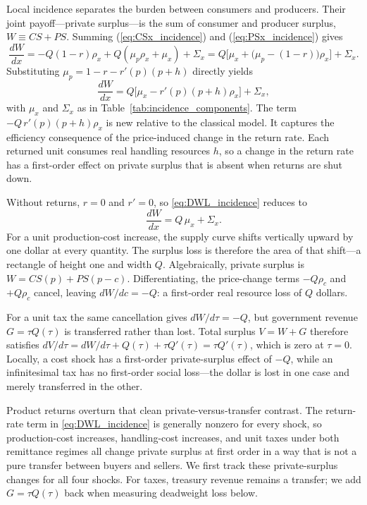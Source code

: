 \documentclass[11pt]{article}
\begin{document}
Local incidence separates the burden between consumers and producers.  Their
joint payoff---private surplus---is the sum of consumer and producer surplus,
$W\equiv CS+PS$.  Summing (\ref{eq:CSx_incidence}) and
(\ref{eq:PSx_incidence}) gives
\[
  \frac{dW}{dx}
  = -Q(1-r)\rho_x
    + Q(\mu_p\rho_x + \mu_x)
    + \Sigma_x
  = Q\bigl[\mu_x + \bigl(\mu_p-(1-r)\bigr)\rho_x\bigr]
    + \Sigma_x.
\]
Substituting $\mu_p=1-r-r'(p)(p+h)$ directly yields
\begin{equation}
  \frac{dW}{dx}
  = Q\bigl[\mu_x - r'(p)(p+h)\rho_x\bigr] + \Sigma_x,
  \label{eq:DWL_incidence}
\end{equation}
with $\mu_x$ and $\Sigma_x$ as in Table~\ref{tab:incidence_components}.
The term $-Q\,r'(p)(p+h)\rho_x$ is new relative to the classical model.  It
captures the efficiency consequence of the price-induced change in the return
rate.  Each returned unit consumes real handling resources $h$, so a change in
the return rate has a first-order effect on private surplus that is absent
when returns are shut down.

Without returns, $r=0$ and $r'=0$, so \eqref{eq:DWL_incidence} reduces to
\[
  \frac{dW}{dx} = Q\,\mu_x + \Sigma_x.
\]
For a unit production-cost increase, the supply curve shifts vertically upward
by one dollar at every quantity.  The surplus loss is therefore the area of
that shift---a rectangle of height one and width $Q$.  Algebraically, private
surplus is $W=CS(p)+PS(p-c)$.  Differentiating, the price-change terms
$-Q\rho_c$ and $+Q\rho_c$ cancel, leaving $dW/dc=-Q$: a first-order real
resource loss of $Q$ dollars.

For a unit tax the same cancellation gives $dW/d\tau=-Q$, but government
revenue $G=\tau Q(\tau)$ is transferred rather than lost.  Total surplus
$V=W+G$ therefore satisfies
$dV/d\tau=dW/d\tau+Q(\tau)+\tau Q'(\tau)=\tau Q'(\tau)$, which is zero at
$\tau=0$.  Locally, a cost shock has a first-order private-surplus effect of
$-Q$, while an infinitesimal tax has no first-order social loss---the dollar
is lost in one case and merely transferred in the other.

Product returns overturn that clean private-versus-transfer contrast.  The
return-rate term in \eqref{eq:DWL_incidence} is generally nonzero for every
shock, so production-cost increases, handling-cost increases, and unit taxes
under both remittance regimes all change private surplus at first order in a
way that is not a pure transfer between buyers and sellers.  We first track
these private-surplus changes for all four shocks.  For taxes, treasury
revenue remains a transfer; we add $G=\tau Q(\tau)$ back when measuring
deadweight loss below.
\end{document}
